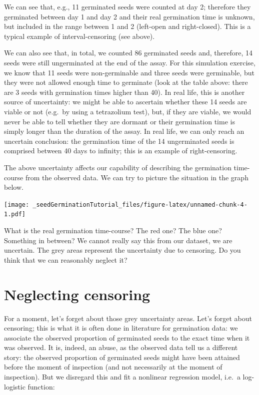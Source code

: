 \documentclass[
]{book}
\begin{document}
We can see that, e.g., 11 germinated seeds were counted at day 2; therefore they germinated between day 1 and day 2 and their real germination time is unknown, but included in the range between 1 and 2 (left-open and right-closed). This is a typical example of interval-censoring (see above).

We can also see that, in total, we counted 86 germinated seeds and, therefore, 14 seeds were still ungerminated at the end of the assay. For this simulation exercise, we know that 11 seeds were non-germinable and three seeds were germinable, but they were not allowed enough time to germinate (look at the table above: there are 3 seeds with germination times higher than 40). In real life, this is another source of uncertainty: we might be able to ascertain whether these 14 seeds are viable or not (e.g.~by using a tetrazolium test), but, if they are viable, we would never be able to tell whether they are dormant or their germination time is simply longer than the duration of the assay. In real life, we can only reach an uncertain conclusion: the germination time of the 14 ungerminated seeds is comprised between 40 days to infinity; this is an example of right-censoring.

The above uncertainty affects our capability of describing the germination time-course from the observed data. We can try to picture the situation in the graph below.

\texttt{[image: \_seedGerminationTutorial\_files/figure-latex/unnamed-chunk-4-1.pdf]}

What is the real germination time-course? The red one? The blue one? Something in between? We cannot really say this from our dataset, we are uncertain. The grey areas represent the uncertainty due to censoring. Do you think that we can reasonably neglect it?

\hypertarget{neglecting-censoring}{%
\section{Neglecting censoring}\label{neglecting-censoring}}

For a moment, let's forget about those grey uncertainty areas. Let's forget about censoring; this is what it is often done in literature for germination data: we associate the observed proportion of germinated seeds to the exact time when it was observed. It is, indeed, an abuse, as the observed data tell us a different story: the observed proportion of germinated seeds might have been attained before the moment of inspection (and not necessarily at the moment of inspection). But we disregard this and fit a nonlinear regression model, i.e.~a log-logistic function:
\end{document}
